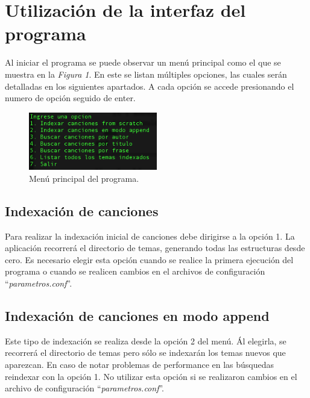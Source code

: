 \documentclass{article}
\begin{document}
\section{Utilización de la interfaz del programa}

	Al iniciar el programa se puede observar un menú principal como el que se muestra en la \textit{Figura 1}. En este se listan múltiples opciones, las cuales serán detalladas en los siguientes apartados. A cada opción se accede presionando el numero de opción seguido de enter.
	\bigskip

\begin{figure}[h]
	\centering
	\includegraphics[width=0.50\textwidth]{images/menu.png}
	\medskip
	\caption{Menú principal del programa.}
\end{figure}
\bigskip\smallskip



\subsection{Indexación de canciones}

	Para realizar la indexación inicial de canciones debe dirigirse a la opción 1. La aplicación recorrerá el directorio de temas, generando todas las estructuras desde cero. Es necesario elegir esta opción cuando se realice la primera ejecución del programa o cuando se realicen cambios en el archivos de configuración ``\textit{parametros.conf}''.
\bigskip



\subsection{Indexación de canciones en modo append}

	Este tipo de indexación se realiza desde la opción 2 del menú. Ál elegirla, se recorrerá el directorio de temas pero sólo se indexarán los temas nuevos que aparezcan. En caso de notar problemas de performance en las búsquedas reindexar con la opción 1. No utilizar esta opción si se realizaron cambios en el archivo de configuración ``\textit{parametros.conf}''.
\bigskip
\end{document}
